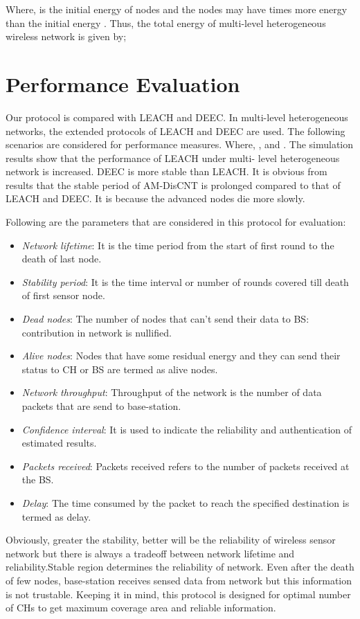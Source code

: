 \documentclass[journal]{IEEEtran}
\begin{document}
 Where,  is the initial energy of nodes and the nodes may have  times more energy than the initial energy . Thus, the total energy of multi-level heterogeneous wireless network is given by;




\section{Performance Evaluation}
  Our protocol is compared with LEACH and DEEC. In multi-level heterogeneous  networks, the extended protocols of LEACH and DEEC are used. The following scenarios are considered for performance measures. Where,  ,  and . The simulation results show that the performance of LEACH under multi- level heterogeneous network is increased. DEEC is more stable than LEACH. It is obvious from results that the stable period of AM-DisCNT is prolonged compared to that of LEACH and DEEC. It is because the advanced nodes die more slowly.

 Following are the parameters that are considered in this protocol for evaluation:
 \begin{itemize}
  \item \emph{Network lifetime}: It is the time period from the start of first round to the death of last node.
  \item \emph{Stability period}: It is the time interval or number of rounds covered till death of first sensor node.
  \item \emph{Dead nodes}: The number of nodes that can't send their data to BS: contribution in network is nullified.
  \item \emph{Alive nodes}: Nodes that have some residual energy and they can send their status to CH or BS are termed as alive nodes.
  \item \emph{Network throughput}: Throughput of the network is the number of data packets that are send to base-station.
  \item \emph{Confidence interval}: It is used to indicate the reliability and authentication of estimated results.
  \item \emph{Packets received}: Packets received refers to the number of packets received at the BS.
  \item\emph{Delay}: The time consumed by the packet to reach the specified destination is termed as delay.
 \end{itemize}
 Obviously, greater the stability, better will be the reliability of wireless sensor network but there is always a tradeoff between network lifetime and reliability.Stable region determines the reliability of network. Even after the death of few nodes, base-station receives sensed data from network but this information is not trustable. Keeping it in mind, this protocol is designed for optimal number of CHs to get maximum coverage area and reliable information.
\end{document}
